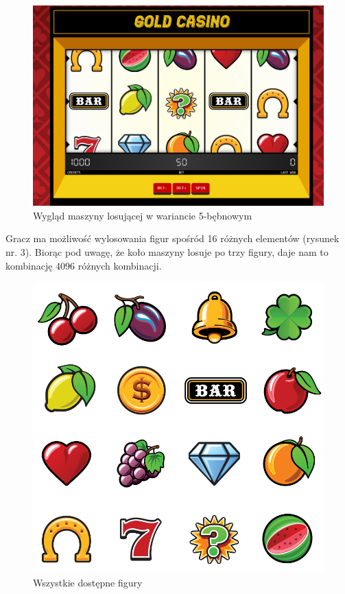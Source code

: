 \documentclass[a4paper,11pt,titlepage]{article}
\begin{document}
\begin{figure}[H]
\centering
\includegraphics[width=1\columnwidth]{img/screen32.PNG}
\caption{Wygląd maszyny losującej w wariancie 5-bębnowym} 
\end{figure}

Gracz ma możliwość wylosowania figur spośród 16 różnych elementów (rysunek nr. 3). Biorąc pod uwagę, że koło maszyny losuje po trzy figury, daje nam to kombinację 4096 różnych kombinacji.

\begin{figure}[H]
\centering
\includegraphics[width=1\columnwidth]{img/ikony.PNG}
\caption{Wszystkie dostępne figury} 
\end{figure}
\end{document}

